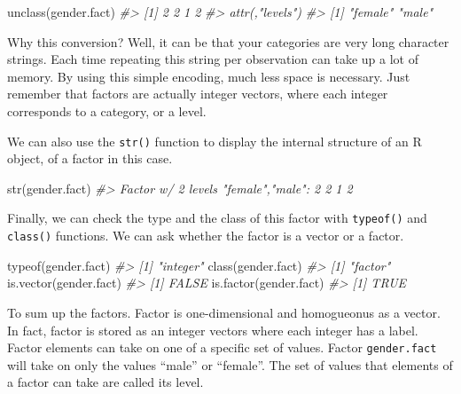 \documentclass[
]{book}
\newenvironment{Shaded}{\begin{snugshade}}{\end{snugshade}}
\newcommand{\CommentTok}[1]{\textcolor[rgb]{0.56,0.35,0.01}{\textit{#1}}}
\newcommand{\FunctionTok}[1]{\textcolor[rgb]{0.00,0.00,0.00}{#1}}
\newcommand{\NormalTok}[1]{#1}
\begin{document}
\begin{Shaded}
\begin{Highlighting}[]
\FunctionTok{unclass}\NormalTok{(gender.fact)}
\CommentTok{\#\textgreater{} [1] 2 2 1 2}
\CommentTok{\#\textgreater{} attr(,"levels")}
\CommentTok{\#\textgreater{} [1] "female" "male"}
\end{Highlighting}
\end{Shaded}

Why this conversion? Well, it can be that your categories are very long character strings. Each time repeating this string per observation can take up a lot of memory. By using this simple encoding, much less space is necessary. Just remember that factors are actually integer vectors, where each integer corresponds to a category, or a level.

We can also use the \texttt{str()} function to display the internal structure of an R object, of a factor in this case.

\begin{Shaded}
\begin{Highlighting}[]
\FunctionTok{str}\NormalTok{(gender.fact)}
\CommentTok{\#\textgreater{}  Factor w/ 2 levels "female","male": 2 2 1 2}
\end{Highlighting}
\end{Shaded}

Finally, we can check the type and the class of this factor with \texttt{typeof()} and \texttt{class()} functions. We can ask whether the factor is a vector or a factor.

\begin{Shaded}
\begin{Highlighting}[]
\FunctionTok{typeof}\NormalTok{(gender.fact)}
\CommentTok{\#\textgreater{} [1] "integer"}
\FunctionTok{class}\NormalTok{(gender.fact)}
\CommentTok{\#\textgreater{} [1] "factor"}
\FunctionTok{is.vector}\NormalTok{(gender.fact)}
\CommentTok{\#\textgreater{} [1] FALSE}
\FunctionTok{is.factor}\NormalTok{(gender.fact)}
\CommentTok{\#\textgreater{} [1] TRUE}
\end{Highlighting}
\end{Shaded}

To sum up the factors. Factor is one-dimensional and homogueonus as a vector. In fact, factor is stored as an integer vectors where each integer has a label. Factor elements can take on one of a specific set of values. Factor \texttt{gender.fact} will take on only the values ``male'' or ``female''. The set of values that elements of a factor can take are called its level.
\end{document}
